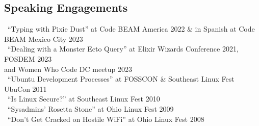 \documentclass[headline, letterpaper]{res}
\begin{document}
\begin{resume}
	\section{Speaking Engagements}
			\textbullet \ ``Typing with Pixie Dust'' at Code BEAM America 2022 \& in Spanish at Code BEAM Mexico City 2023\\
			\textbullet \ ``Dealing with a Monster Ecto Query'' at Elixir Wizards Conference 2021, FOSDEM 2023\\     
			\hspace*{0.25in}and Women Who Code DC meetup 2023\\
			\textbullet \ ``Ubuntu Development Processes'' at FOSSCON \& Southeast Linux Fest UbuCon 2011\\
			\textbullet \ ``Is Linux Secure?'' at Southeast Linux Fest 2010\\
			\textbullet \ ``Sysadmins' Rosetta Stone'' at Ohio Linux Fest 2009\\
			\textbullet \ ``Don't Get Cracked on Hostile WiFi'' at Ohio Linux Fest 2008\\

			
			
			
			


\end{resume}
\end{document}

